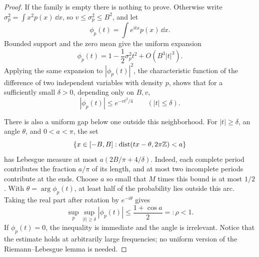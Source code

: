 \begin{proof}
If the family is empty there is nothing to prove.  Otherwise write
$\sigma_p^2=\int x^2p(x)\,\dd x$, so
$v\leq\sigma_p^2\leq B^2$, and let
\[
 \phi_p(t)=\int e^{itx}p(x)\,\dd x.
\]
Bounded support and the zero mean give the uniform expansion
\begin{equation}\label{eq:uniform-characteristic-expansion}
 \phi_p(t)=1-\frac12\sigma_p^2t^2+O(B^3|t|^3).
\end{equation}
Applying the same expansion to
$|\phi_p(t)|^2$, the characteristic function of the difference of two
independent variables with density $p$, shows that for a sufficiently
small $\delta>0$, depending only on $B,v$,
\begin{equation}\label{eq:small-frequency-domination}
 |\phi_p(t)|\leq e^{-vt^2/4}\qquad(|t|\leq\delta).
\end{equation}

There is also a uniform gap below one outside this neighborhood.  For
$|t|\geq\delta$, an angle $\theta$, and $0<a<\pi$, the set
\[
 \{x\in[-B,B]:\operatorname{dist}(tx-\theta,2\pi\mathbb Z)<a\}
\]
has Lebesgue measure at most
$a(2B/\pi+4/\delta)$.  Indeed, each complete period contributes the
fraction $a/\pi$ of its length, and at most two incomplete periods
contribute at the ends.  Choose $a$ so small that $M$ times this bound
is at most $1/2$.  With $\theta=\arg\phi_p(t)$, at least half of the
probability lies outside this arc.  Taking the real part after rotation
by $e^{-i\theta}$ gives
\begin{equation}\label{eq:large-frequency-gap}
 \sup_p\sup_{|t|\geq\delta}|\phi_p(t)|
 \leq\frac{1+\cos a}{2}=:\rho<1.
\end{equation}
If $\phi_p(t)=0$, the inequality is immediate and the angle is
irrelevant.  Notice that the estimate holds at arbitrarily large
frequencies; no uniform version of the Riemann--Lebesgue lemma is needed.


\end{proof}
